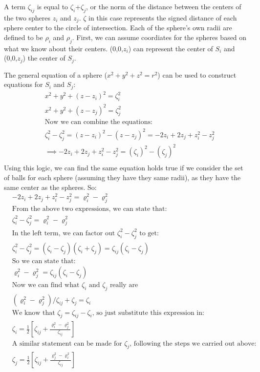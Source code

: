 \documentclass{article}
\begin{document}
A term $\zeta_{ij}$ is equal to  $\zeta_i$+$\zeta_j$, or the norm of the distance between the centers of the two spheres $z_i$ and $z_j$. $\zeta$ in this case represents the signed distance of each sphere center to the circle of intersection. Each of the sphere's own radii are defined to be $\rho_i$ and $\rho_j$. First, we can assume coordiates for the spheres based on what we know about their centers. (0,0,$z_i$) can represent the center of $S_i$ and (0,0,$z_j$) the center of $S_j$.


The general equation of a sphere ($x^2 + y^2 +z^2 = r^2$) can be used to construct equations for $S_i$ and $S_j$:
\begin{align*}
&x^2 + y^2 +(z-z_i)^2 = \zeta_i^2 \\
&x^2 + y^2 +(z-z_j)^2 = \zeta_j^2 \\
&\text{Now we can combine the equations:} \\
&\zeta_i^2-\zeta_j^2 =(z-z_i)^2-(z-z_j)^2=-2z_i +2z_j +z_i^2 - z_j^2\\
& \implies -2z_i +2z_j +z_i^2 - z_j^2 = (\zeta_i)^2-(\zeta_j)^2\\
\end{align*}
Using this logic, we can find the same equation holds true if we consider the set of balls for each sphere (assuming they have they same radii), as they have the same center as the spheres. So:
\begin{align*}
&-2z_i +2z_j +z_i^2 - z_j^2 = \varrho_i^2-\varrho_j^2 \\
&\text{From the above two expressions, we can state that:} \\
&\zeta_i^2-\zeta_j^2 = \varrho_i^2-\varrho_j^2\\
&\text{In the left term, we can factor out $\zeta_i^2-\zeta_j^2$ to get:} \\
&\zeta_i^2-\zeta_j^2 =(\zeta_i-\zeta_j)(\zeta_i+\zeta_j) = \zeta_{ij}(\zeta_i-\zeta_j) \\
&\text{So we can state that:} \\
&\varrho_i^2 - \varrho_j^2  = \zeta_{ij}(\zeta_i-\zeta_j) \\
&\text{Now we can find what $\zeta_i$ and $\zeta_j$ really are} \\
&(\varrho_i^2 - \varrho_j^2)/\zeta_{ij} + \zeta_j = \zeta_i \\
&\text{We know that $\zeta_j = \zeta_{ij} - \zeta_i$, so just substitute this expression in:} \\
&\zeta_i = \frac{1}{2}\left[\zeta_{ij}+\frac{\varrho_i^2-\varrho_j^2}{\zeta_{ij}}\right] \\
&\text{A similar statement can be made for $\zeta_j$, following the steps we carried out above:} \\
&\zeta_j = \frac{1}{2}\left[\zeta_{ij}+\frac{\varrho_j^2-\varrho_i^2}{\zeta_{ij}}\right]
\end{align*}
\end{document}
